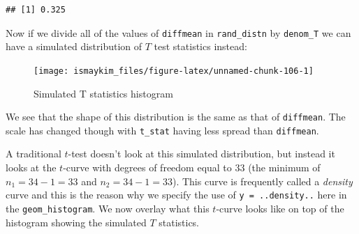 \documentclass[]{tufte-book}
\newenvironment{Shaded}{\begin{snugshade}}{\end{snugshade}}
\newcommand{\KeywordTok}[1]{\textcolor[rgb]{0.13,0.29,0.53}{\textbf{{#1}}}}
\newcommand{\DataTypeTok}[1]{\textcolor[rgb]{0.13,0.29,0.53}{{#1}}}
\newcommand{\DecValTok}[1]{\textcolor[rgb]{0.00,0.00,0.81}{{#1}}}
\newcommand{\StringTok}[1]{\textcolor[rgb]{0.31,0.60,0.02}{{#1}}}
\newcommand{\NormalTok}[1]{{#1}}
\begin{document}
\begin{verbatim}
## [1] 0.325
\end{verbatim}

Now if we divide all of the values of \texttt{diffmean} in
\texttt{rand\_distn} by \texttt{denom\_T} we can have a simulated
distribution of \(T\) test statistics instead:

\begin{Shaded}
\end{Shaded}

\begin{figure}

{\centering \texttt{[image: ismaykim\_files/figure-latex/unnamed-chunk-106-1]} 

}

\caption[Simulated T statistics histogram]{Simulated T statistics histogram}\label{fig:unnamed-chunk-106}
\end{figure}

We see that the shape of this distribution is the same as that of
\texttt{diffmean}. The scale has changed though with \texttt{t\_stat}
having less spread than \texttt{diffmean}.

A traditional \(t\)-test doesn't look at this simulated distribution,
but instead it looks at the \(t\)-curve with degrees of freedom equal to
33 (the minimum of \(n_1 = 34 - 1 = 33\) and \(n_2 = 34 - 1 = 33\)).
This curve is frequently called a \emph{density} curve and this is the
reason why we specify the use of \texttt{y\ =\ ..density..} here in the
\texttt{geom\_histogram}. We now overlay what this \(t\)-curve looks
like on top of the histogram showing the simulated \(T\) statistics.
\end{document}
